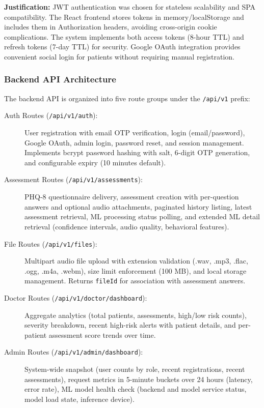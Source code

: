 \documentclass[12pt]{article}
\begin{document}
	\textbf{Justification:} JWT authentication was chosen for stateless scalability and SPA compatibility. The React frontend stores tokens in memory/localStorage and includes them in Authorization headers, avoiding cross-origin cookie complications. The system implements both access tokens (8-hour TTL) and refresh tokens (7-day TTL) for security. Google OAuth integration provides convenient social login for patients without requiring manual registration.

	\subsubsection{Backend API Architecture}

	The backend API is organized into five route groups under the \texttt{/api/v1} prefix:

	\begin{description}
		\item[Auth Routes (\texttt{/api/v1/auth}):] User registration with email OTP verification, login (email/password), Google OAuth, admin login, password reset, and session management. Implements bcrypt password hashing with salt, 6-digit OTP generation, and configurable expiry (10 minutes default).

		\item[Assessment Routes (\texttt{/api/v1/assessments}):] PHQ-8 questionnaire delivery, assessment creation with per-question answers and optional audio attachments, paginated history listing, latest assessment retrieval, ML processing status polling, and extended ML detail retrieval (confidence intervals, audio quality, behavioral features).

		\item[File Routes (\texttt{/api/v1/files}):] Multipart audio file upload with extension validation (.wav, .mp3, .flac, .ogg, .m4a, .webm), size limit enforcement (100 MB), and local storage management. Returns \texttt{fileId} for association with assessment answers.

		\item[Doctor Routes (\texttt{/api/v1/doctor/dashboard}):] Aggregate analytics (total patients, assessments, high/low risk counts), severity breakdown, recent high-risk alerts with patient details, and per-patient assessment score trends over time.

		\item[Admin Routes (\texttt{/api/v1/admin/dashboard}):] System-wide snapshot (user counts by role, recent registrations, recent assessments), request metrics in 5-minute buckets over 24 hours (latency, error rate), ML model health check (backend and model service status, model load state, inference device).
	\end{description}
\end{document}
